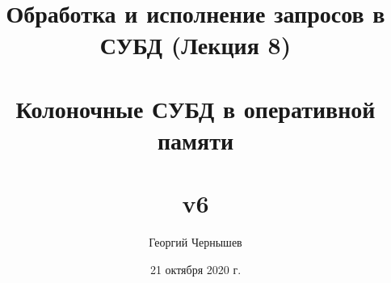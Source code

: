 \documentclass{beamer}
\title[Обработка и исполнение запросов: лекция 8]{Обработка и исполнение запросов в СУБД (Лекция 8) \\~\\ Колоночные СУБД в оперативной памяти\\~\\ v6} %
\author{Георгий Чернышев} %
\institute[ВШЭ] %
{
Высшая Школа Экономики \\ %
\medskip
\textit{chernishev@gmail.com} %
}
\date{21 октября 2020 г.}
\begin{document}
\begin{frame}
\titlepage %
\end{frame}

\end{document}
